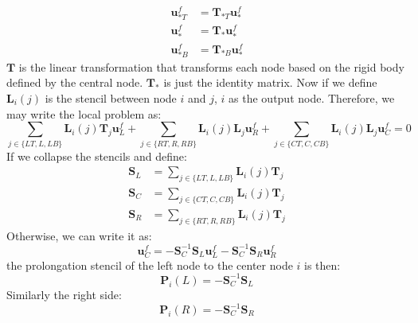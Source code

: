  \begin{align*}
 \mathbf{u}^f_{*T} &= \mathbf{T}_{*T}\mathbf{u}^f_{*} \\
 \mathbf{u}^f_{*} &= \mathbf{T}_{*} \mathbf{u}^f_{*} \\
 \mathbf{u}^f_{*B} &=  \mathbf{T}_{*B}\mathbf{u}^f_{*} 
\end{align*}
$\mathbf{T}$ is the linear transformation that transforms each node based on the rigid body defined by the central node. $\mathbf{T}_*$ is just the identity matrix. Now if we define $\mathbf{L}_i(j)$ is the stencil between node $i$ and $j$, $i$ as the output node. Therefore, we may write the local problem as:
\begin{equation}
\label{equ:local_equation}
\sum_{j\in\{LT,L,LB\}}\mathbf{L}_i(j)\mathbf{T}_{j}\mathbf{u}^f_{L} + \sum_{j\in\{RT,R,RB\}}\mathbf{L}_i(j)\mathbf{L}_{j}\mathbf{u}^f_{R} + \sum_{j\in\{CT,C,CB\}}\mathbf{L}_i(j)\mathbf{L}_{j}\mathbf{u}^f_{C} = 0 
\end{equation}
If we collapse the stencils and define:
\begin{align*}
\mathbf{S}_L &= \sum_{j\in\{LT,L,LB\}}\mathbf{L}_i(j)\mathbf{T}_{j}\\
\mathbf{S}_C &= \sum_{j\in\{CT,C,CB\}}\mathbf{L}_i(j)\mathbf{T}_{j}\\
\mathbf{S}_R &= \sum_{j\in\{RT,R,RB\}}\mathbf{L}_i(j)\mathbf{T}_{j}
\end{align*}
Otherwise, we can write it as:
\begin{equation}
\label{equ:sol_stencil_collapse}
 \mathbf{u}^f_{C} = -\mathbf{S}_C^{-1}\mathbf{S}_L\mathbf{u}^f_{L} -\mathbf{S}_C^{-1}\mathbf{S}_R\mathbf{u}^f_{R}
\end{equation}
the prolongation stencil of the left node to the center node $i$ is then:
\begin{equation}
\label{equ:P_stencil_collapse}
\mathbf{P}_i(L) = -\mathbf{S}_C^{-1}\mathbf{S}_L
\end{equation}
Similarly the right side:
\begin{equation}
\mathbf{P}_i(R) = -\mathbf{S}_C^{-1}\mathbf{S}_R
\end{equation}
